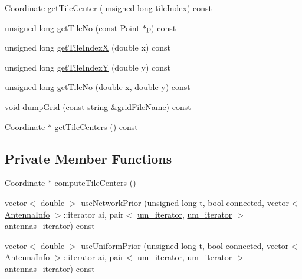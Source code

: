 \begin{DoxyCompactItemize}
\item 
Coordinate \hyperlink{class_grid_aa8d3de015a2b22d0cd0d72b3e7c29088}{get\+Tile\+Center} (unsigned long tile\+Index) const
\item 
unsigned long \hyperlink{class_grid_a93e42713b7af1f188ce90f92a5e202ab}{get\+Tile\+No} (const Point $\ast$p) const
\item 
unsigned long \hyperlink{class_grid_a5ab67c336ac08c690a0e8b03c12f02e5}{get\+Tile\+IndexX} (double x) const
\item 
unsigned long \hyperlink{class_grid_ad745f856bb2b27382118ac03fafc06b4}{get\+Tile\+IndexY} (double y) const
\item 
unsigned long \hyperlink{class_grid_a02dee9ad3ee575623916c0041f72eb5e}{get\+Tile\+No} (double x, double y) const
\item 
void \hyperlink{class_grid_a0024d8d3cdd7b95f9fd61205ce8b9dea}{dump\+Grid} (const string \&grid\+File\+Name) const
\item 
Coordinate $\ast$ \hyperlink{class_grid_aa1b1f4c938207b16694a27cb9beb66eb}{get\+Tile\+Centers} () const
\end{DoxyCompactItemize}
\subsection*{Private Member Functions}
\begin{DoxyCompactItemize}
\item 
Coordinate $\ast$ \hyperlink{class_grid_a8948d61db8ba1bda2260590677eaaa01}{compute\+Tile\+Centers} ()
\item 
vector$<$ double $>$ \hyperlink{class_grid_a4bd2091f95030e86b78e7be903667e06}{use\+Network\+Prior} (unsigned long t, bool connected, vector$<$ \hyperlink{class_antenna_info}{Antenna\+Info} $>$\+::iterator ai, pair$<$ \hyperlink{_agents_collection_8h_afde47bc45d604b8b8c72755072376679}{um\+\_\+iterator}, \hyperlink{_agents_collection_8h_afde47bc45d604b8b8c72755072376679}{um\+\_\+iterator} $>$ antennas\+\_\+iterator) const
\item 
vector$<$ double $>$ \hyperlink{class_grid_ac77c744828c5cf70dd5650217475e25b}{use\+Uniform\+Prior} (unsigned long t, bool connected, vector$<$ \hyperlink{class_antenna_info}{Antenna\+Info} $>$\+::iterator ai, pair$<$ \hyperlink{_agents_collection_8h_afde47bc45d604b8b8c72755072376679}{um\+\_\+iterator}, \hyperlink{_agents_collection_8h_afde47bc45d604b8b8c72755072376679}{um\+\_\+iterator} $>$ antennas\+\_\+iterator) const
\end{DoxyCompactItemize}
